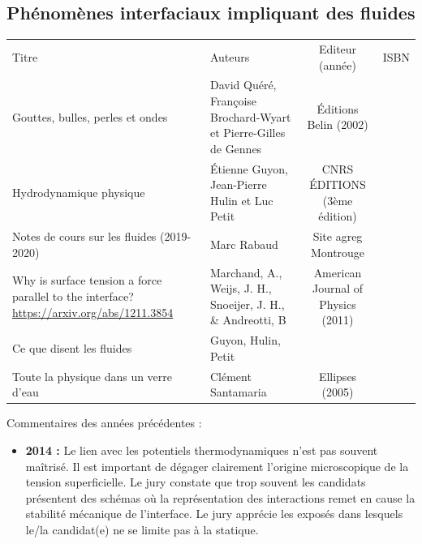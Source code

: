 \begin{headerBlock}
  \chapter{Phénomènes interfaciaux impliquant des fluides}
    \label{LP_PhenomenesInterfaciaux}
\end{headerBlock}

\begin{center}
\begin{tabularx}{\textwidth}{| X | X | c | c |}
  \hline
  \rowcolor{gray!20}\multicolumn{4}{c}{Bibliographie de la leçon : } \\
  \hline 
  Titre & Auteurs & Editeur (année) & ISBN \\
  \hline
 Gouttes, bulles, perles et ondes & David Quéré, Françoise Brochard-Wyart et Pierre-Gilles de Gennes & \'Editions Belin (2002) &    \\
  \hline 
 Hydrodynamique physique & \'Etienne Guyon, Jean-Pierre Hulin et Luc Petit  &  CNRS ÉDITIONS (3ème édition) &    \\
  \hline 
Notes de cours sur les fluides (2019-2020) & Marc Rabaud  &  Site agreg Montrouge  &    \\
  \hline 
 Why is surface tension a force parallel to the interface? \url{https://arxiv.org/abs/1211.3854} & Marchand, A., Weijs, J. H., Snoeijer, J. H., \& Andreotti, B   & American Journal of Physics (2011)  &    \\
  \hline
  Ce que disent les fluides & Guyon, Hulin, Petit & & \\
  \hline
  Toute la physique dans un verre d'eau & Clément Santamaria & Ellipses (2005) & \\
  \hline
\end{tabularx}
\end{center}

\begin{reportBlock}{Commentaires des années précédentes :}
    \begin{itemize}
        \item \textbf{2014 :} Le lien avec les potentiels thermodynamiques n’est pas souvent maîtrisé. Il est important de dégager clairement l’origine microscopique de la tension superficielle. Le jury constate que trop souvent les candidats présentent des schémas où la représentation des interactions remet en cause la stabilité mécanique de l’interface. Le jury apprécie les exposés dans lesquels le/la candidat(e) ne se limite pas à la statique.
    \end{itemize}
\end{reportBlock}

